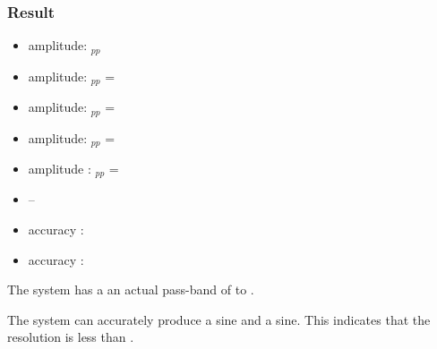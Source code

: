 \subsubsection*{Result}
\begin{itemize}
    \item {} amplitude: $_{pp}$
    \item {} amplitude: $_{pp}$ = 
    \item {} amplitude: $_{pp}$ = 
    \item {} amplitude: $_{pp}$ = 
    \item {} amplitude : $_{pp}$ = 
    \item --
    \item {} accuracy : 
    \item {} accuracy :  
\end{itemize}



The system has a an actual pass-band of  to . 

The system can accurately produce a  sine and a  sine. This indicates that the resolution is less than .